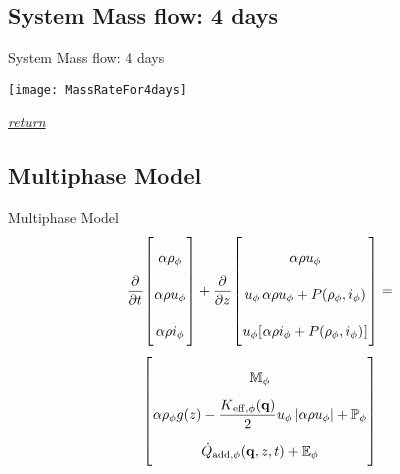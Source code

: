     
    
    \subsection*{System Mass flow: 4 days}
    \begin{frame}[c,label=MassFlow4Days]{System Mass flow: 4 days}
        \begin{center}
            \texttt{[image: MassRateFor4days]}
        \end{center}
        \hfill\textit{\tiny\hyperlink{MassFlowAnnotate}{return}}
    \end{frame}
    
    
    
    \subsection*{Multiphase Model}
    \begin{frame}[label=Multiphase]{Multiphase Model}
         \begin{equation}
            \renewcommand{\arraystretch}{2.2}
            \pdiff{}{t}\begin{bmatrix}
                           \rhok \\
                           \rhouk \\
                           \rhoik 
                        \end{bmatrix}
            + 
            \pdiff{}{z}\begin{bmatrix}
                            \rhouk                 \\
                            \uk\,    \rhouk  + P(\rho\subs{\phi},\ik)   \\
                            \uk\left[\rhoik  + P(\rho\subs{\phi},\ik)\right]
                        \end{bmatrix}
                     = 
        \end{equation}
        \begin{equation}\renewcommand{\arraystretch}{2.2}
            \begin{bmatrix}
                \mathbb{M}\subs{\phi} \\
                \rhok{g(z)} - \frac{\Keff\subs{,\phi}(\qCon)}{2} \uk\,|\rhouk| + \mathbb{P}\subs{\phi}  \\
                \dot{Q}\subs{add,\phi}(\qCon,z,t) + \mathbb{E}\subs{\phi}
            \end{bmatrix}
            \notag
        \end{equation}
    \end{frame}
